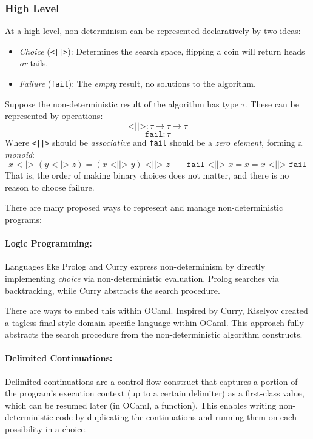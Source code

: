 \subsubsection{High Level}
At a high level, non-determinism can be represented declaratively by two ideas:
\begin{itemize}
\item \textit{Choice} (\texttt{<||>}): Determines the search space, flipping a coin will return heads \textit{or} tails.
\item \textit{Failure} (\texttt{fail}): The \textit{empty} result, no solutions to the algorithm.
\end{itemize}
Suppose the non-deterministic result of the algorithm has type $\tau$. These can be represented by operations:
\[\texttt{<||>} : \tau \to \tau \to \tau\]
\[\texttt{fail} : \tau\]
Where \texttt{<||>} should be \textit{associative} and \texttt{fail} should be a \textit{zero element}, forming a \textit{monoid}:
\[x \texttt{ <||> } (y \texttt{ <||> } z) = (x \texttt{ <||> } y) \texttt{ <||> } z \qquad \texttt{fail} \texttt{ <||> } x = x = x \texttt{ <||> } \texttt{fail}\]
That is, the order of making binary choices does not matter, and there is no reason to choose failure.

There are many proposed ways to represent and manage non-deterministic programs: 
\paragraph{Logic Programming:} Languages like Prolog \cite{Prolog} and Curry \cite{CurryLang} express non-determinism by directly implementing \textit{choice} via non-deterministic evaluation. Prolog searches via backtracking, while Curry abstracts the search procedure.

There are ways to embed this within OCaml. Inspired by Curry, Kiselyov \cite{NondetDSL} created a tagless final style \cite{TaglessFinalDSL} domain specific language within OCaml. This approach fully abstracts the search procedure from the non-deterministic algorithm constructs.
\paragraph{Delimited Continuations:} Delimited continuations \cite{DelimitedControl, ShiftReset} are a control flow construct that captures a portion of the program's execution context (up to a certain delimiter) as a first-class value, which can be resumed later (in OCaml, a function). This enables writing non-deterministic code by duplicating the continuations and running them on each possibility in a choice.

